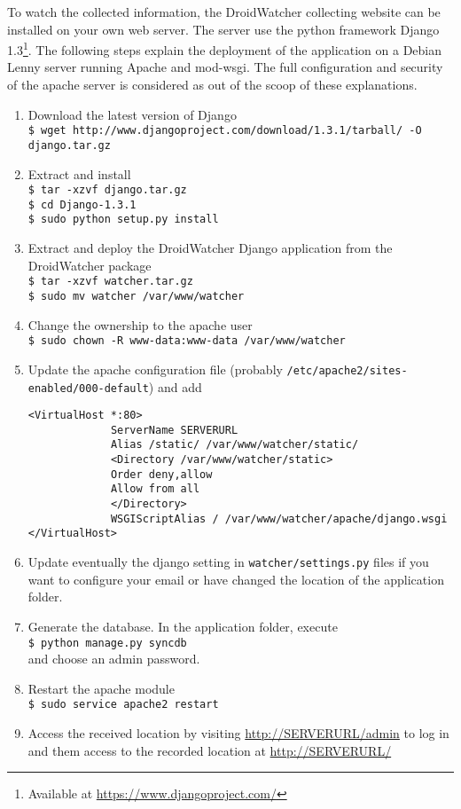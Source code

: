 To watch the collected information, the DroidWatcher collecting website can be installed on your own web server.
The server use the python framework Django 1.3\footnote{Available at \url{https://www.djangoproject.com/}}.
The following steps explain the deployment of the application on a Debian Lenny server running Apache and mod-wsgi. The full configuration and security of the apache server is considered as out of the scoop of these explanations.

\begin{enumerate}
\item Download the latest version of Django\\
  \texttt{\$ wget http://www.djangoproject.com/download/1.3.1/tarball/ -O django.tar.gz}
\item Extract and install\\
  \texttt{\$ tar -xzvf django.tar.gz\\\$ cd Django-1.3.1\\\$ sudo python setup.py install}
\item Extract and deploy the DroidWatcher Django application from the DroidWatcher package\\
  \texttt{\$ tar -xzvf watcher.tar.gz\\\$ sudo mv watcher /var/www/watcher}
\item Change the ownership to the apache user\\
  \texttt{\$ sudo chown -R www-data:www-data /var/www/watcher}
\item Update the apache configuration file (probably \texttt{/etc/apache2/sites-enabled/000-default}) and add
\begin{verbatim}
<VirtualHost *:80>
             ServerName SERVERURL
             Alias /static/ /var/www/watcher/static/
             <Directory /var/www/watcher/static>
             Order deny,allow
             Allow from all
             </Directory>
             WSGIScriptAlias / /var/www/watcher/apache/django.wsgi
</VirtualHost>
\end{verbatim}
\item Update eventually the django setting in \texttt{watcher/settings.py} files if you want to configure your email or have changed the location of the application folder.
\item Generate the database. In the application folder, execute\\
  \texttt{\$ python manage.py syncdb}\\
  and choose an admin password.
\item Restart the apache module\\
  \texttt{\$ sudo service apache2 restart}
\item Access the received location by visiting \url{http://SERVERURL/admin} to log in and them access to the recorded location at \url{http://SERVERURL/}
\end{enumerate}
